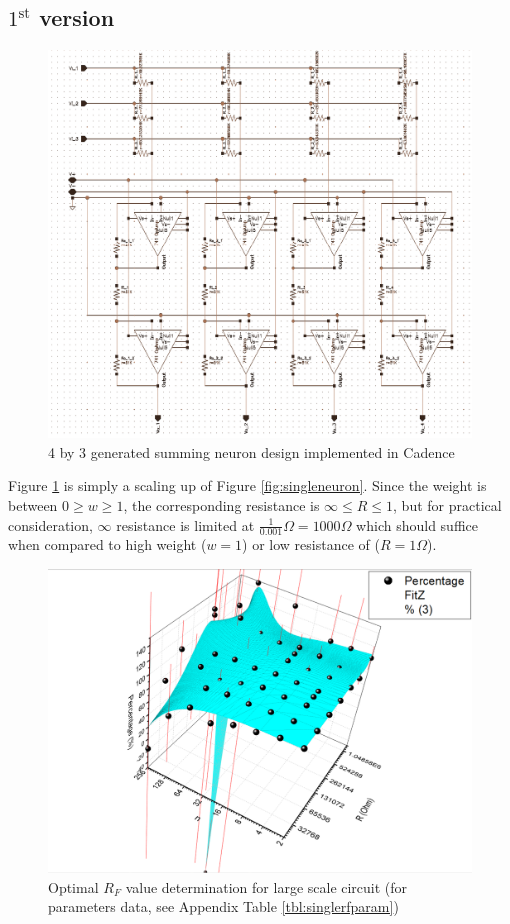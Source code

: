 \subsection{$\text{1}^{\text{st}}$ version} %
\begin{figure}[H]
	\centering
	\includegraphics[scale=0.5]{version1.png}
	\caption{4 by 3 generated summing neuron design implemented in Cadence}
	\label{fig:ver1}
\end{figure}
Figure \ref{fig:ver1} is simply a scaling up of Figure \ref{fig:singleneuron}. Since the weight is between $0\geq w \geq1$, the corresponding resistance is $\infty \leq R \leq1$, but for practical consideration, $\infty$ resistance is limited at $\frac{1}{0.001}\Omega=1000\Omega$ which should suffice when compared to high weight ($w=1$) or low resistance of ($R=1\Omega$). 
\begin{figure}[H]
	\centering
	\includegraphics[scale=0.5]{singlerfadj.png}
	\caption{Optimal $R_F$ value determination for large scale circuit (for parameters data, see Appendix Table \ref{tbl:singlerfparam})}
	\label{fig:rfsinglescale}
\end{figure}
